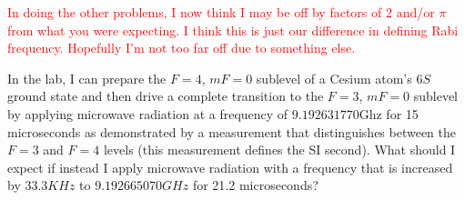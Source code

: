 \documentclass[12pt]{article} %
\begin{document}
\begin{solution}
\textcolor{red}{In doing the other problems, I now think I may be off by factors of 2 and/or $\pi$ from what you were expecting. I think this is just our difference in defining Rabi frequency. Hopefully I'm not too far off due to something else.}
\end{solution}

\newpage
\begin{problem}
In the lab, I can prepare the $F=4$, $mF=0$ sublevel of a Cesium atom's $6S$ ground state and then drive a complete transition to the $F=3$, $mF=0$ sublevel by applying microwave radiation at a frequency of $9.192631770$Ghz for 15 microseconds as demonstrated by a measurement that distinguishes between the $F=3$ and $F=4$ levels (this measurement defines the SI second). What should I expect if instead I apply microwave radiation with a frequency that is increased by $33.3 \si{KHz}$ to $9.192665070 \si{GHz}$ for 21.2 microseconds?
\end{problem}
\end{document}
